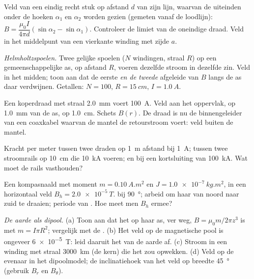 \begin{exercise}[$\star\star$]\label{exo:b1:magnetostatics:5}
Veld van een eindig recht stuk op afstand $d$ van zijn lijn, waarvan de
uiteinden onder de hoeken $\alpha_1$ en $\alpha_2$ worden gezien (gemeten vanaf de
loodlijn): $B = \dfrac{\mu_0I}{4\pi d}(\sin\alpha_2 - \sin\alpha_1)$. Controleer
de limiet van de oneindige draad. Veld in het middelpunt van een vierkante winding met zijde
$a$.
\end{exercise}

\begin{exercise}[$\star\star$]\label{exo:b1:magnetostatics:6}
\emph{Helmholtzspoelen.} Twee gelijke spoelen ($N$ windingen, straal $R$) op een
gemeenschappelijke as, op afstand $R$, voeren dezelfde stroom in dezelfde
zin. Veld in het midden; toon aan dat de eerste \emph{en de tweede}
afgeleide van $B$ langs de as daar verdwijnen. Getallen: $N = 100$,
$R = \qty{15}{cm}$, $I = \qty{1.0}{A}$.
\end{exercise}

\begin{exercise}[$\star\star$]\label{exo:b1:magnetostatics:7}
Een koperdraad met straal \qty{2.0}{mm} voert \qty{100}{A}. Veld aan het
oppervlak, op \qty{1.0}{mm} van de as, op \qty{1.0}{cm}. Schets $B(r)$.
De draad is nu de binnengeleider van een coaxkabel waarvan de mantel
de retourstroom voert: veld buiten de mantel.
\end{exercise}

\begin{exercise}[$\star\star$]\label{exo:b1:magnetostatics:8}
Kracht per meter tussen twee draden op \qty{1}{m} afstand bij \qty{1}{A}; tussen
twee stroomrails op \qty{10}{cm} die \qty{10}{kA} voeren; en bij een
kortsluiting van \qty{100}{kA}. Wat moet de rails vasthouden?
\end{exercise}

\begin{exercise}[$\star\star$]\label{exo:b1:magnetostatics:9}
Een kompasnaald met moment $m = \qty{0.10}{A.m^2}$ en 
$J = \qty{1.0e-7}{kg.m^2}$, in een horizontaal veld $B_h = \qty{2.0e-5}{T}$.
 bij \qty{90}{\degree}; arbeid om haar van noord naar zuid te draaien; periode
van . Hoe meet men $B_h$ ermee?
\end{exercise}

\begin{exercise}[$\star\star\star$]\label{exo:b1:magnetostatics:10}
\emph{De aarde als dipool.} (a) Toon aan dat het  op haar as,
ver weg, $B = \mu_0m/2\pi z^3$ is met $m = I\pi R^2$; vergelijk met de
. (b) Het veld op de magnetische pool is ongeveer
\qty{6e-5}{T}: leid daaruit het  van de aarde af. (c) Stroom in een winding
met straal \qty{3000}{km} (de kern) die het zou opwekken. (d) Veld op
de evenaar in het dipoolmodel; de inclinatiehoek van het veld op
breedte \qty{45}{\degree} (gebruik $B_r$ en $B_\theta$).
\end{exercise}

